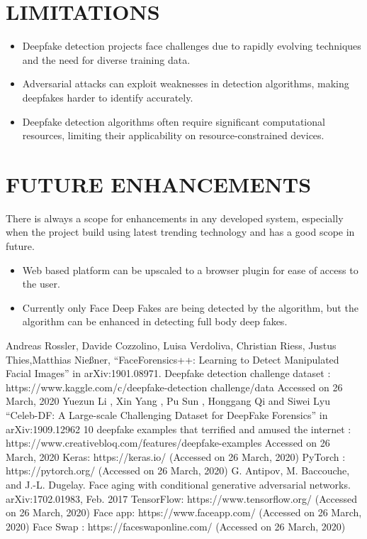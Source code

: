 \documentclass[12 pt]{article}
\begin{document}
\section{LIMITATIONS}
\begin{itemize}
    \item Deepfake detection projects face challenges due to rapidly evolving techniques and the need for diverse training data.
    \item Adversarial attacks can exploit weaknesses in detection algorithms, making deepfakes harder to identify accurately.
    \item Deepfake detection algorithms often require significant computational resources, limiting their applicability on resource-constrained devices.
\end{itemize}
\newpage
\section{FUTURE ENHANCEMENTS}
There is always a scope for enhancements in any developed system, especially
when the project build using latest trending technology and has a good scope in
future.
\begin{itemize}
    \item Web based platform can be upscaled to a browser plugin for ease of access to
          the user.
    \item Currently only Face Deep Fakes are being detected by the algorithm, but the
          algorithm can be enhanced in detecting full body deep fakes.
\end{itemize}
\newpage

\begin{thebibliography}{99}
    Andreas Rossler, Davide Cozzolino, Luisa Verdoliva, Christian Riess, Justus
    Thies,Matthias Nießner, “FaceForensics++: Learning to Detect Manipulated Facial
    Images” in arXiv:1901.08971.
    Deepfake detection challenge dataset : https://www.kaggle.com/c/deepfake-detection challenge/data Accessed on 26 March, 2020
     Yuezun Li , Xin Yang , Pu Sun , Honggang Qi and Siwei Lyu “Celeb-DF: A
    Large-scale Challenging Dataset for DeepFake Forensics” in arXiv:1909.12962
    10 deepfake examples that terrified and amused the internet :
    https://www.creativebloq.com/features/deepfake-examples Accessed on 26 March,
    2020
    Keras: https://keras.io/ (Accessed on 26 March, 2020)
    PyTorch : https://pytorch.org/ (Accessed on 26 March, 2020)
    G. Antipov, M. Baccouche, and J.-L. Dugelay. Face aging with conditional generative adversarial networks. arXiv:1702.01983, Feb. 2017
     TensorFlow: https://www.tensorflow.org/ (Accessed on 26 March, 2020)
    Face app: https://www.faceapp.com/ (Accessed on 26 March, 2020)
    Face Swap : https://faceswaponline.com/ (Accessed on 26 March, 2020)

\end{thebibliography}
\end{document}
